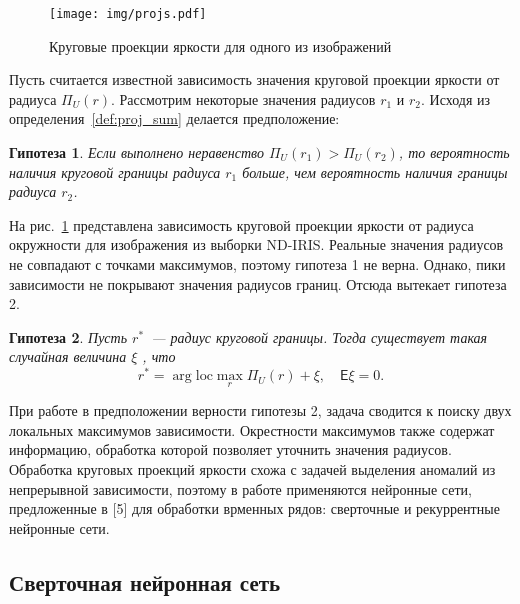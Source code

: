 \documentclass[12pt, twoside]{article}
\newtheorem{hop}{Гипотеза}
\begin{document}
\begin{figure}[!htbp]
	\centering
	\texttt{[image: img/projs.pdf]}
	\caption{Круговые проекции яркости для одного из изображений}
	\label{fig:projs}
\end{figure}

Пусть считается известной зависимость значения круговой проекции яркости от радиуса $\Pi_U(r)$. Рассмотрим некоторые значения радиусов $r_1$ и $r_2$. Исходя из определения~\ref{def:proj_sum} делается предположение:
\begin{hop}
Если выполнено неравенство $\Pi_U(r_1) > \Pi_U(r_2)$, то вероятность наличия круговой границы радиуса $r_1$ больше, чем вероятность наличия границы радиуса $r_2$.
\end{hop}

На рис.~\ref{fig:projs} представлена зависимость круговой проекции яркости от радиуса окружности для изображения из выборки ND-IRIS. Реальные значения радиусов не совпадают с точками максимумов, поэтому гипотеза 1 не верна. Однако, пики зависимости не покрывают значения радиусов границ. Отсюда вытекает гипотеза 2.

\begin{hop}
Пусть $r^*$~--- радиус круговой границы. Тогда существует такая случайная величина $\xi$ , что
\[
 r^* = \arg \text{loc}\max\limits_{r}\Pi_U(r) + \xi, \quad \mathsf{E}\xi=0.
\]
\end{hop}

При работе в предположении верности гипотезы 2, задача сводится к поиску двух локальных максимумов зависимости. Окрестности максимумов также содержат информацию, обработка которой позволяет уточнить значения радиусов. Обработка круговых проекций яркости схожа с задачей выделения аномалий из непрерывной зависимости, поэтому в работе применяются нейронные сети, предложенные в [5] для обработки врменных рядов: сверточные и рекуррентные нейронные сети.

\subsection{Сверточная нейронная сеть}
\end{document}
